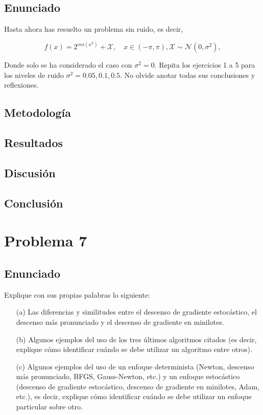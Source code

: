 \documentclass{article}
\begin{document}
\subsection{Enunciado}

Hasta ahora has resuelto un problema sin ruido, es decir,

\begin{equation*}
    f(x)=2^{cos(x^2)}+\mathcal{X}, \quad x \in (-\pi,\pi), \mathcal{X} \sim \mathcal{N}(0,\sigma^{2}),
\end{equation*}

Donde solo se ha considerado el caso con $\sigma^2=0$. Repita los ejercicios 1 a 5 para los niveles de ruido $\sigma^2 = 0.05,0.1,0.5$. No olvide anotar todas sus conclusiones y reflexiones.

\subsection{Metodología}

\subsection{Resultados}
\setcounter{equation}{0}

\subsection{Discusión}

\subsection{Conclusión}

\section{Problema 7}

\subsection{Enunciado}

Explique con sus propias palabras lo siguiente:

\begin{itemize}
    \item[(a)] Las diferencias y similitudes entre el descenso de gradiente estocástico, el descenso más pronunciado y el descenso de gradiente en minilotes.
    \item[(b)] Algunos ejemplos del uso de los tres últimos algoritmos citados (es decir, explique cómo identificar cuándo se debe utilizar un algoritmo entre otros).
    \item[(c)] Algunos ejemplos del uso de un enfoque determinista (Newton, descenso más pronunciado, BFGS, Gauss-Newton, etc.) y un enfoque estocástico (descenso de gradiente estocástico, descenso de gradiente en minilotes, Adam, etc.), es decir, explique cómo identificar cuándo se debe utilizar un enfoque particular sobre otro.

\end{itemize}
\end{document}
